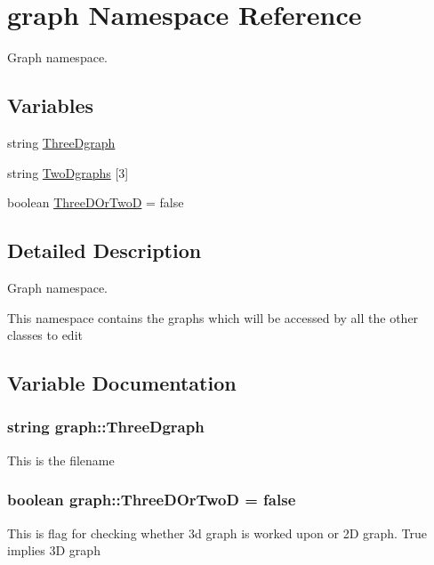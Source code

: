 \hypertarget{namespacegraph}{}\section{graph Namespace Reference}
\label{namespacegraph}


Graph namespace.  


\subsection*{Variables}
\begin{DoxyCompactItemize}
\item 
string \hyperlink{namespacegraph_ae7ef3a07e00c4b673fc5d6254cf20f34}{Three\+Dgraph}
\item 
string \hyperlink{namespacegraph_a718228685c9255e4d36f3f3c1294e607}{Two\+Dgraphs} \mbox{[}3\mbox{]}
\item 
boolean \hyperlink{namespacegraph_ae9531d9ba52931cf97c3423d61ba8e5d}{Three\+D\+Or\+TwoD} = false
\end{DoxyCompactItemize}


\subsection{Detailed Description}
Graph namespace. 

This namespace contains the graphs which will be accessed by all the other classes to edit 

\subsection{Variable Documentation}
\subsubsection[{\texorpdfstring{Three\+Dgraph}{ThreeDgraph}}]{\setlength{\rightskip}{0pt plus 5cm}string graph\+::\+Three\+Dgraph}\hypertarget{namespacegraph_ae7ef3a07e00c4b673fc5d6254cf20f34}{}\label{namespacegraph_ae7ef3a07e00c4b673fc5d6254cf20f34}
This is the filename 
\subsubsection[{\texorpdfstring{Three\+D\+Or\+TwoD}{ThreeDOrTwoD}}]{\setlength{\rightskip}{0pt plus 5cm}boolean graph\+::\+Three\+D\+Or\+TwoD = false}\hypertarget{namespacegraph_ae9531d9ba52931cf97c3423d61ba8e5d}{}\label{namespacegraph_ae9531d9ba52931cf97c3423d61ba8e5d}
This is flag for checking whether 3d graph is worked upon or 2D graph. True implies 3D graph 
